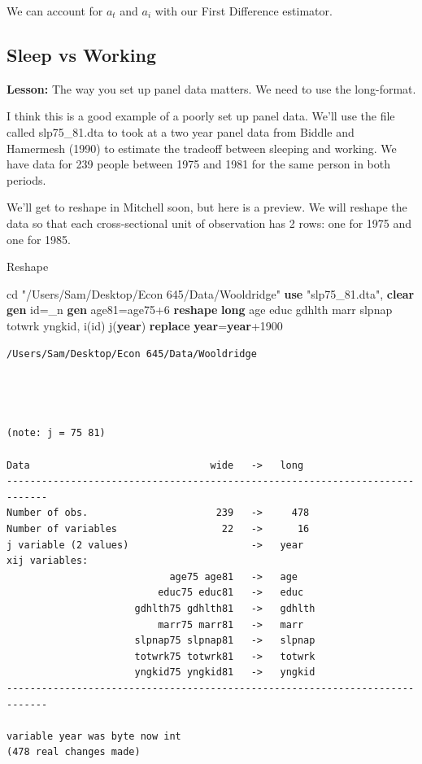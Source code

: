 \documentclass[
]{book}
\newenvironment{Shaded}{\begin{snugshade}}{\end{snugshade}}
\newcommand{\DataTypeTok}[1]{\textcolor[rgb]{0.13,0.29,0.53}{#1}}
\newcommand{\FunctionTok}[1]{\textcolor[rgb]{0.13,0.29,0.53}{\textbf{#1}}}
\newcommand{\KeywordTok}[1]{\textcolor[rgb]{0.13,0.29,0.53}{\textbf{#1}}}
\newcommand{\NormalTok}[1]{#1}
\newcommand{\StringTok}[1]{\textcolor[rgb]{0.31,0.60,0.02}{#1}}
\begin{document}
We can account for \(a_t\) and \(a_i\) with our First Difference estimator.

\subsection{Sleep vs Working}\label{sleep-vs-working}

\textbf{Lesson:} The way you set up panel data matters. We need to use the long-format.

I think this is a good example of a poorly set up panel data. We'll use the file called slp75\_81.dta to took at a two year panel data from Biddle and Hamermesh (1990) to estimate the tradeoff between sleeping and working. We have data for 239 people between 1975 and 1981 for the same person in both periods.

We'll get to reshape in Mitchell soon, but here is a preview. We will reshape the data so that each cross-sectional unit of observation has 2 rows: one for 1975 and one for 1985.

Reshape

\begin{Shaded}
\begin{Highlighting}[]
\NormalTok{cd }\StringTok{"/Users/Sam/Desktop/Econ 645/Data/Wooldridge"}
\KeywordTok{use} \StringTok{"slp75\_81.dta"}\NormalTok{, }\KeywordTok{clear}
\KeywordTok{gen}\NormalTok{ id=}\DataTypeTok{\_n}
\KeywordTok{gen}\NormalTok{ age81=age75+6}
\KeywordTok{reshape} \KeywordTok{long}\NormalTok{ age educ gdhlth marr slpnap totwrk yngkid, i(id) j(}\FunctionTok{year}\NormalTok{)}
\KeywordTok{replace} \FunctionTok{year}\NormalTok{=}\FunctionTok{year}\NormalTok{+1900}
\end{Highlighting}
\end{Shaded}

\begin{verbatim}
/Users/Sam/Desktop/Econ 645/Data/Wooldridge




(note: j = 75 81)

Data                               wide   ->   long
-----------------------------------------------------------------------------
Number of obs.                      239   ->     478
Number of variables                  22   ->      16
j variable (2 values)                     ->   year
xij variables:
                            age75 age81   ->   age
                          educ75 educ81   ->   educ
                      gdhlth75 gdhlth81   ->   gdhlth
                          marr75 marr81   ->   marr
                      slpnap75 slpnap81   ->   slpnap
                      totwrk75 totwrk81   ->   totwrk
                      yngkid75 yngkid81   ->   yngkid
-----------------------------------------------------------------------------

variable year was byte now int
(478 real changes made)
\end{verbatim}
\end{document}
